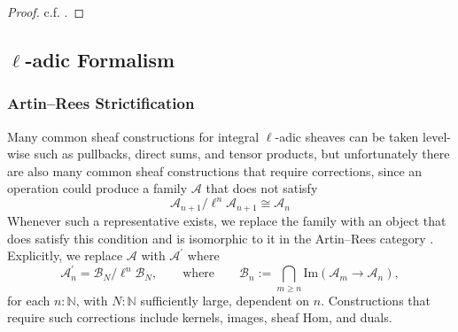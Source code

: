 \documentclass[11pt,letterpaper]{article}
\theoremstyle{numberfirstplain}
\numberwithin{equation}{theorem}
\theoremstyle{numberfirstupright}
\begin{document}
\begin{proof}
c.f. \cite[Theorem~3.6.3 and Remark~3.6.4]{Szamuely2009}.
\end{proof}
\fi

%
%

\subsection{\texorpdfstring{$\ell$}{l}-adic Formalism}\label{app:corrections}

\subsubsection{Artin–Rees Strictification}\label{app:artin-rees-rationalization}

Many common sheaf constructions for integral $\ell$-adic sheaves can be taken level-wise such as pullbacks, direct sums, and tensor products, but unfortunately there are also many common sheaf constructions that require corrections, since an operation could produce a family $\mathcal A$ that does not satisfy 
$$\mathcal A_{n+1}/\ell^n \mathcal A_{n+1}\cong \mathcal A_n$$
Whenever such a representative exists, we replace the family with an object that does satisfy this condition and is isomorphic to it in the Artin–Rees category \cite[Exp.~V]{SGA5}. 
Explicitly, we replace $\mathcal A$ with $\mathcal A^\prime$ where 
$$\mathcal A^\prime_n=\mathcal B_N/\ell^n\mathcal B_N,\qquad\text{where}\qquad \mathcal B_n:=\bigcap_{m\ge n}\mathrm{Im}(\mathcal A_m\longrightarrow\mathcal A_n),$$
for each $n:\mathbb N$, with $N:\mathbb N$ sufficiently large, dependent on $n$.
Constructions that require such corrections include kernels, images, sheaf Hom, and duals. 
\end{document}
